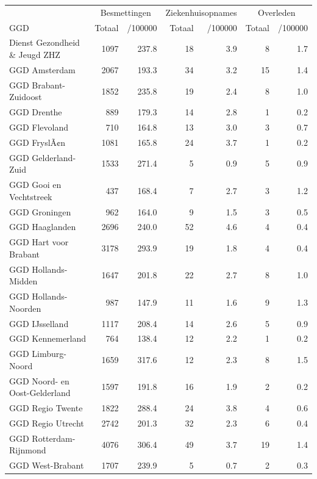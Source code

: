 \documentclass[
  english,
  man,floatsintext]{apa6}
\begin{document}
\begin{table}
\centering\begingroup\fontsize{10}{12}\selectfont

\begin{threeparttable}
\begin{tabular}{lrrrrrr}
\toprule
\multicolumn{1}{c}{ } & \multicolumn{2}{c}{Besmettingen} & \multicolumn{2}{c}{Ziekenhuisopnames} & \multicolumn{2}{c}{Overleden} \\
\cmidrule(l{3pt}r{3pt}){2-3} \cmidrule(l{3pt}r{3pt}){4-5} \cmidrule(l{3pt}r{3pt}){6-7}
GGD & Totaal & /100000 & Totaal & /100000 & Totaal & /100000\\
\midrule
Dienst Gezondheid \& Jeugd ZHZ & 1097 & 237.8 & 18 & 3.9 & 8 & 1.7\\
GGD Amsterdam & 2067 & 193.3 & 34 & 3.2 & 15 & 1.4\\
GGD Brabant-Zuidoost & 1852 & 235.8 & 19 & 2.4 & 8 & 1.0\\
GGD Drenthe & 889 & 179.3 & 14 & 2.8 & 1 & 0.2\\
GGD Flevoland & 710 & 164.8 & 13 & 3.0 & 3 & 0.7\\
GGD FryslÃ¢n & 1081 & 165.8 & 24 & 3.7 & 1 & 0.2\\
GGD Gelderland-Zuid & 1533 & 271.4 & 5 & 0.9 & 5 & 0.9\\
GGD Gooi en Vechtstreek & 437 & 168.4 & 7 & 2.7 & 3 & 1.2\\
GGD Groningen & 962 & 164.0 & 9 & 1.5 & 3 & 0.5\\
GGD Haaglanden & 2696 & 240.0 & 52 & 4.6 & 4 & 0.4\\
GGD Hart voor Brabant & 3178 & 293.9 & 19 & 1.8 & 4 & 0.4\\
GGD Hollands-Midden & 1647 & 201.8 & 22 & 2.7 & 8 & 1.0\\
GGD Hollands-Noorden & 987 & 147.9 & 11 & 1.6 & 9 & 1.3\\
GGD IJsselland & 1117 & 208.4 & 14 & 2.6 & 5 & 0.9\\
GGD Kennemerland & 764 & 138.4 & 12 & 2.2 & 1 & 0.2\\
GGD Limburg-Noord & 1659 & 317.6 & 12 & 2.3 & 8 & 1.5\\
GGD Noord- en Oost-Gelderland & 1597 & 191.8 & 16 & 1.9 & 2 & 0.2\\
GGD Regio Twente & 1822 & 288.4 & 24 & 3.8 & 4 & 0.6\\
GGD Regio Utrecht & 2742 & 201.3 & 32 & 2.3 & 6 & 0.4\\
GGD Rotterdam-Rijnmond & 4076 & 306.4 & 49 & 3.7 & 19 & 1.4\\
GGD West-Brabant & 1707 & 239.9 & 5 & 0.7 & 2 & 0.3\\

\end{tabular}
\end{threeparttable}
\end{table}
\end{document}
